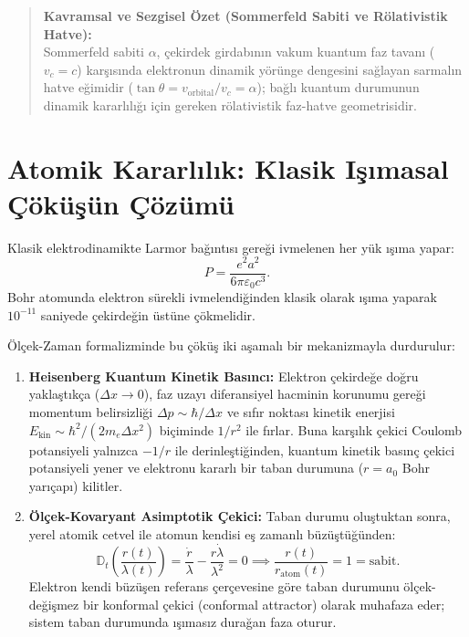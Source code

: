 \documentclass[11pt,a4paper]{article}
\begin{document}
\begin{quote}
    \small
    \textbf{Kavramsal ve Sezgisel Özet (Sommerfeld Sabiti ve Rölativistik Hatve):} \\
    Sommerfeld sabiti $\alpha$, çekirdek girdabının vakum kuantum faz tavanı ($v_c = c$) karşısında elektronun dinamik yörünge dengesini sağlayan sarmalın hatve eğimidir ($\tan\theta = v_{\mathrm{orbital}} / v_c = \alpha$); bağlı kuantum durumunun dinamik kararlılığı için gereken rölativistik faz-hatve geometrisidir.
\end{quote}

\section{Atomik Kararlılık: Klasik Işımasal Çöküşün Çözümü}
\label{sec:atomik_kararlilik}

Klasik elektrodinamikte Larmor bağıntısı gereği ivmelenen her yük ışıma yapar:
\begin{equation}
    P = \frac{e^2 a^2}{6\pi \varepsilon_0 c^3}.
    \label{eq:larmor_tr}
\end{equation}
Bohr atomunda elektron sürekli ivmelendiğinden klasik olarak ışıma yaparak $10^{-11}$ saniyede çekirdeğin üstüne çökmelidir.

Ölçek-Zaman formalizminde bu çöküş iki aşamalı bir mekanizmayla durdurulur:
\begin{enumerate}
    \item \textbf{Heisenberg Kuantum Kinetik Basıncı:} Elektron çekirdeğe doğru yaklaştıkça ($\Delta x \to 0$), faz uzayı diferansiyel hacminin korunumu gereği momentum belirsizliği $\Delta p \sim \hbar / \Delta x$ ve sıfır noktası kinetik enerjisi $E_{\mathrm{kin}} \sim \hbar^2 / (2m_e \Delta x^2)$ biçiminde $1/r^2$ ile fırlar. Buna karşılık çekici Coulomb potansiyeli yalnızca $-1/r$ ile derinleştiğinden, kuantum kinetik basınç çekici potansiyeli yener ve elektronu kararlı bir taban durumuna ($r = a_0$ Bohr yarıçapı) kilitler.
    \item \textbf{Ölçek-Kovaryant Asimptotik Çekici:} Taban durumu oluştuktan sonra, yerel atomik cetvel ile atomun kendisi eş zamanlı büzüştüğünden:
          \begin{equation}
              \mathbb{D}_t \left( \frac{r(t)}{\lambda(t)} \right) = \frac{\dot{r}}{\lambda} - \frac{r \dot{\lambda}}{\lambda^2} = 0 \implies \frac{r(t)}{r_{\mathrm{atom}}(t)} = 1 = \text{sabit}.
              \label{eq:kararlilik_ispat}
          \end{equation}
          Elektron kendi büzüşen referans çerçevesine göre taban durumunu ölçek-değişmez bir konformal çekici (conformal attractor) olarak muhafaza eder; sistem taban durumunda ışımasız durağan faza oturur.
\end{enumerate}
\end{document}
